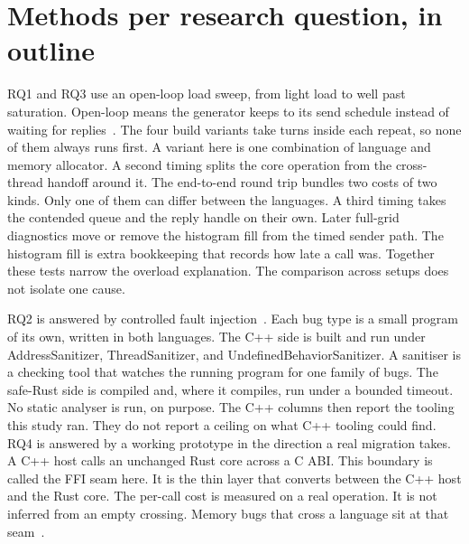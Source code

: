 \documentclass[english,oneside,a4paper,censored,csm,software-track-2020]{HYthesisML}
\begin{document}
\section[Methods per research question]{Methods per research question, in outline}\label{sec:methodbrief}
RQ1 and RQ3 use an open-loop load sweep, from light load to well past saturation.
Open-loop means the generator keeps to its send schedule instead of waiting for replies~\cite{schroeder2006openclosed}.
The four build variants take turns inside each repeat, so none of them always runs first.
A variant here is one combination of language and memory allocator.
A second timing splits the core operation from the cross-thread handoff around it.
The end-to-end round trip bundles two costs of two kinds. Only one of them can differ between the languages.
A third timing takes the contended queue and the reply handle on their own.
Later full-grid diagnostics move or remove the histogram fill from the timed sender path.
The histogram fill is extra bookkeeping that records how late a call was.
Together these tests narrow the overload explanation.
The comparison across setups does not isolate one cause.

RQ2 is answered by controlled fault injection~\cite{natella2016fault}.
Each bug type is a small program of its own, written in both languages.
The C++ side is built and run under AddressSanitizer, ThreadSanitizer, and UndefinedBehaviorSanitizer.
A sanitiser is a checking tool that watches the running program for one family of bugs.
The safe-Rust side is compiled and, where it compiles, run under a bounded timeout.
No static analyser is run, on purpose.
The C++ columns then report the tooling this study ran.
They do not report a ceiling on what C++ tooling could find.
RQ4 is answered by a working prototype in the direction a real migration takes.
A C++ host calls an unchanged Rust core across a C ABI.
This boundary is called the FFI seam here.
It is the thin layer that converts between the C++ host and the Rust core.
The per-call cost is measured on a real operation. It is not inferred from an empty crossing.
Memory bugs that cross a language sit at that seam~\cite{li2022crosslang}.
\end{document}
